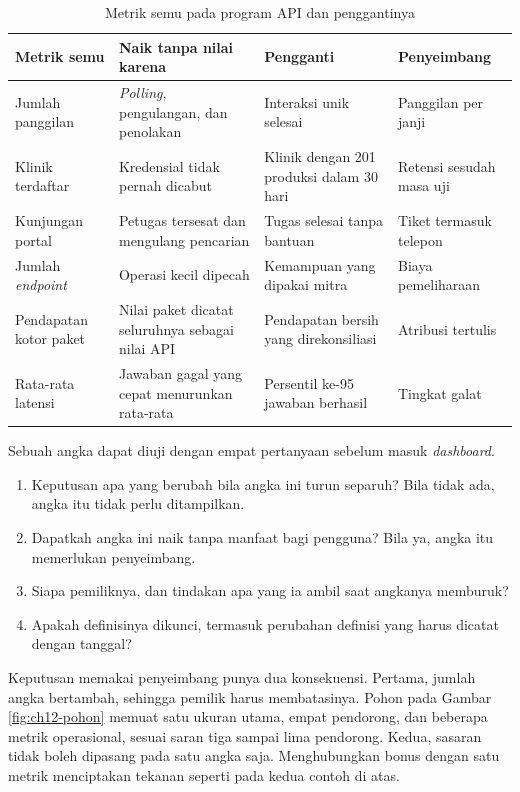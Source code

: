 \begin{table}[!htb]
  \centering
  \caption{Metrik semu pada program API dan penggantinya}
  \label{tab:ch12-metrik-semu}
  \footnotesize
  \begin{tabularx}{\textwidth}{H{2.5cm}GGH{3.0cm}}
    \hline
    \textbf{Metrik semu} & \textbf{Naik tanpa nilai karena} & \textbf{Pengganti} & \textbf{Penyeimbang} \\ \hline
    Jumlah panggilan & \textit{Polling}, pengulangan, dan penolakan & Interaksi unik selesai & Panggilan per janji \\ \hline
    Klinik terdaftar & Kredensial tidak pernah dicabut & Klinik dengan 201 produksi dalam 30 hari & Retensi sesudah masa uji \\ \hline
    Kunjungan portal & Petugas tersesat dan mengulang pencarian & Tugas selesai tanpa bantuan & Tiket termasuk telepon \\ \hline
    Jumlah \textit{endpoint} & Operasi kecil dipecah & Kemampuan yang dipakai mitra & Biaya pemeliharaan \\ \hline
    Pendapatan kotor paket & Nilai paket dicatat seluruhnya sebagai nilai API & Pendapatan bersih yang direkonsiliasi & Atribusi tertulis \\ \hline
    Rata-rata latensi & Jawaban gagal yang cepat menurunkan rata-rata & Persentil ke-95 jawaban berhasil & Tingkat galat \\ \hline
  \end{tabularx}
\end{table}

Sebuah angka dapat diuji dengan empat pertanyaan sebelum masuk \textit{dashboard}.
\begin{enumerate}
  \item Keputusan apa yang berubah bila angka ini turun separuh? Bila tidak ada, angka itu tidak perlu ditampilkan.
  \item Dapatkah angka ini naik tanpa manfaat bagi pengguna? Bila ya, angka itu memerlukan penyeimbang.
  \item Siapa pemiliknya, dan tindakan apa yang ia ambil saat angkanya memburuk?
  \item Apakah definisinya dikunci, termasuk perubahan definisi yang harus dicatat dengan tanggal?
\end{enumerate}

Keputusan memakai penyeimbang punya dua konsekuensi. Pertama, jumlah angka bertambah, sehingga pemilik harus membatasinya. Pohon pada Gambar \ref{fig:ch12-pohon} memuat satu ukuran utama,
empat pendorong, dan beberapa metrik operasional, sesuai saran tiga sampai lima pendorong. Kedua, sasaran tidak boleh dipasang pada satu angka saja. Menghubungkan bonus dengan
satu metrik menciptakan tekanan seperti pada kedua contoh di atas.

